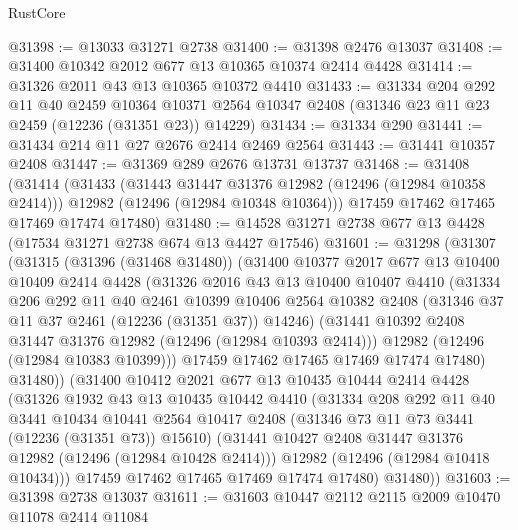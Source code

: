 \begin{lexlean}{RustCore}
\begin{coremodule}
@31398 := @13033 @31271 @2738
@31400 := @31398 @2476 @13037
@31408 := @31400 @10342 @2012 @677 @13 @10365 @10374 @2414 @4428
@31414 := @31326 @2011 @43 @13 @10365 @10372 @4410
@31433 := @31334
    @204
    @292
    @11
    @40
    @2459
    @10364
    @10371
    @2564
    @10347
    @2408
    (@31346 @23 @11 @23 @2459 (@12236 (@31351 @23)) @14229)
@31434 := @31334 @290
@31441 := @31434 @214 @11 @27 @2676 @2414 @2469 @2564
@31443 := @31441 @10357 @2408
@31447 := @31369 @289 @2676 @13731 @13737
@31468 := @31408
    (@31414
      (@31433
        (@31443 @31447 @31376 @12982 (@12496 (@12984 @10358 @2414)))
        @12982
        (@12496 (@12984 @10348 @10364)))
      @17459
      @17462
      @17465
      @17469
      @17474
      @17480)
@31480 := @14528 @31271 @2738 @677 @13 @4428 (@17534 @31271 @2738 @674 @13 @4427 @17546)
@31601 := @31298
    (@31307
      (@31315
        (@31396 (@31468 @31480))
        (@31400
          @10377
          @2017
          @677
          @13
          @10400
          @10409
          @2414
          @4428
          (@31326
            @2016
            @43
            @13
            @10400
            @10407
            @4410
            (@31334
              @206
              @292
              @11
              @40
              @2461
              @10399
              @10406
              @2564
              @10382
              @2408
              (@31346 @37 @11 @37 @2461 (@12236 (@31351 @37)) @14246)
              (@31441 @10392 @2408 @31447 @31376 @12982 (@12496 (@12984 @10393 @2414)))
              @12982
              (@12496 (@12984 @10383 @10399)))
            @17459
            @17462
            @17465
            @17469
            @17474
            @17480)
          @31480))
      (@31400
        @10412
        @2021
        @677
        @13
        @10435
        @10444
        @2414
        @4428
        (@31326
          @1932
          @43
          @13
          @10435
          @10442
          @4410
          (@31334
            @208
            @292
            @11
            @40
            @3441
            @10434
            @10441
            @2564
            @10417
            @2408
            (@31346 @73 @11 @73 @3441 (@12236 (@31351 @73)) @15610)
            (@31441 @10427 @2408 @31447 @31376 @12982 (@12496 (@12984 @10428 @2414)))
            @12982
            (@12496 (@12984 @10418 @10434)))
          @17459
          @17462
          @17465
          @17469
          @17474
          @17480)
        @31480))
@31603 := @31398 @2738 @13037
@31611 := @31603 @10447 @2112 @2115 @2009 @10470 @11078 @2414 @11084

\end{coremodule}
\end{lexlean}
